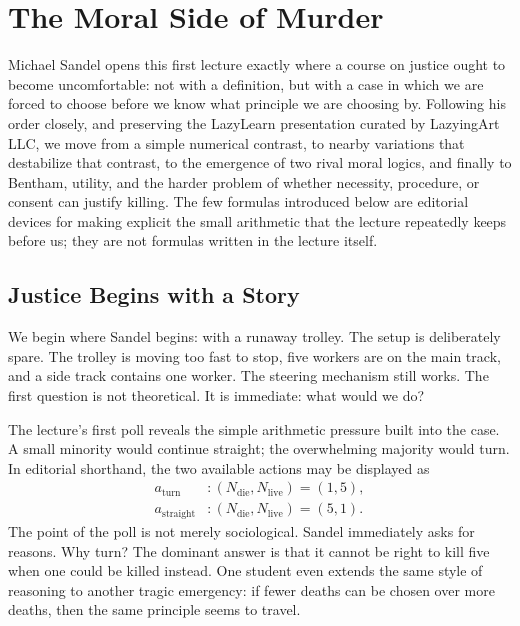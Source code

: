 \chapter{The Moral Side of Murder}

Michael Sandel opens this first lecture exactly where a course on justice ought to become uncomfortable: not with a definition, but with a case in which we are forced to choose before we know what principle we are choosing by. Following his order closely, and preserving the LazyLearn presentation curated by LazyingArt LLC, we move from a simple numerical contrast, to nearby variations that destabilize that contrast, to the emergence of two rival moral logics, and finally to Bentham, utility, and the harder problem of whether necessity, procedure, or consent can justify killing. The few formulas introduced below are editorial devices for making explicit the small arithmetic that the lecture repeatedly keeps before us; they are not formulas written in the lecture itself.

\section{Justice Begins with a Story}

We begin where Sandel begins: with a runaway trolley. The setup is deliberately spare. The trolley is moving too fast to stop, five workers are on the main track, and a side track contains one worker. The steering mechanism still works. The first question is not theoretical. It is immediate: what would we do?

\begin{figure}[h]
\centering
{}
\end{figure}

The lecture's first poll reveals the simple arithmetic pressure built into the case. A small minority would continue straight; the overwhelming majority would turn. In editorial shorthand, the two available actions may be displayed as
\begin{align}
a_{\text{turn}} &: (N_{\text{die}},N_{\text{live}}) = (1,5), \\
a_{\text{straight}} &: (N_{\text{die}},N_{\text{live}}) = (5,1).
\end{align}
The point of the poll is not merely sociological. Sandel immediately asks for reasons. Why turn? The dominant answer is that it cannot be right to kill five when one could be killed instead. One student even extends the same style of reasoning to another tragic emergency: if fewer deaths can be chosen over more deaths, then the same principle seems to travel.

